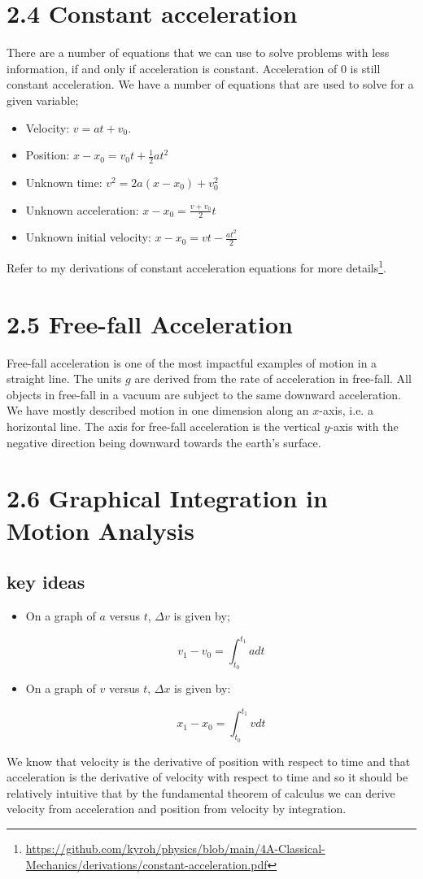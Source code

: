 \documentclass{article}
\begin{document}
\section*{2.4 Constant acceleration}
There are a number of equations that we can use to solve problems with less information, if and only if acceleration is constant.
Acceleration of 0 is still constant acceleration.
We have a number of equations that are used to solve for a given variable;
\begin{itemize}
	\item Velocity: $v = at + v_0$.
	\item Position: $x-x_0 = v_0t + \frac{1}{2} at^2$
	\item Unknown time: $v^2 = 2a \left( x - x_0 \right) + v_0^2$
	\item Unknown acceleration: $x - x_0 = \frac{v + v_0}{2} t$
	\item Unknown initial velocity: $x - x_0 = v t - \frac{at^2}{2}$
\end{itemize}
Refer to my derivations of constant acceleration equations for more details\footnote{\href{https://github.com/kyroh/physics/blob/main/4A-Classical-Mechanics/derivations/constant-acceleration.pdf}{https://github.com/kyroh/physics/blob/main/4A-Classical-Mechanics/derivations/constant-acceleration.pdf}}.

\section*{2.5 Free-fall Acceleration}
Free-fall acceleration is one of the most impactful examples of motion in a straight line.
The units $g$ are derived from the rate of acceleration in free-fall.
All objects in free-fall in a vacuum are subject to the same downward acceleration.
We have mostly described motion in one dimension along an $x$-axis, i.e. a horizontal line.
The axis for free-fall acceleration is the vertical $y$-axis with the negative direction being downward towards the earth's surface.

\section*{2.6 Graphical Integration in Motion Analysis}
\subsection*{key ideas}
\begin{itemize}
	\item On a graph of $a$ versus $t$, $\Delta v$ is given by;

		\[
			v_1 - v_0 = \int_{t_0}^{t_1} a dt
		\]
	\item On a graph of $v$ versus $t$, $\Delta x$ is given by:

		\[
			x_1 - x_0 = \int_{t_0}^{t_1} v dt
		\]
\end{itemize}
We know that velocity is the derivative of position with respect to time and that acceleration is the derivative of velocity with respect to time and so it should be relatively intuitive that by the fundamental theorem of calculus we can derive velocity from acceleration and position from velocity by integration.
\end{document}
